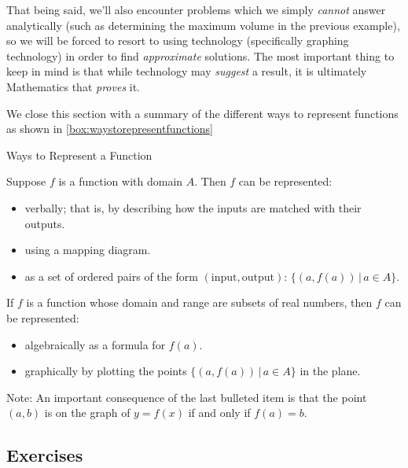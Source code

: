 That being said, we'll also encounter problems which we simply \textit{cannot} answer analytically (such as determining the maximum volume in the previous example), so we will be forced to resort to using technology (specifically graphing technology) in order to find \textit{approximate} solutions.  The most important thing to keep in mind is that while technology may \textit{suggest} a result, it is ultimately Mathematics that \textit{proves} it. 

We close this section with a summary of the different ways to represent functions as shown in \autoref{box:waystorepresentfunctions}

\begin{floatbox}[label=box:waystorepresentfunctions]{Ways to Represent a Function}

Suppose $f$ is a function with domain $A$.  Then $f$ can be represented:

\begin{itemize}

\item  verbally; that is, by describing how the inputs are matched with their outputs.

\item using a mapping diagram.

\item  as a set of ordered pairs of the form $(\text{input}, \text{output})$:  $\{ (a, f(a)) \, | \, a \in A \}$.

\end{itemize}

If $f$ is a function whose domain and range are subsets of real numbers, then $f$ can be represented:

\begin{itemize}

\item  algebraically as a formula for $f(a)$.

\item  graphically by plotting the points $\{ (a, f(a))  \, | \, a \in A \}$ in the plane.

\end{itemize}

Note: An important consequence of the last bulleted item is that the point $(a, b)$ is on the graph of $y = f(x)$ if and only if $f(a) = b.$\label{FundamentalGraphingPrinciple}

\end{floatbox}

\clearpage

\subsection{Exercises}


\closegraphsfile